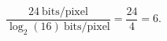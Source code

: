 
\begin{answer}
\[
\frac{24~\text{bits/pixel}}{\log_2(16)~\text{bits/pixel}}
= \frac{24}{4} = 6.
\]

\end{answer}
